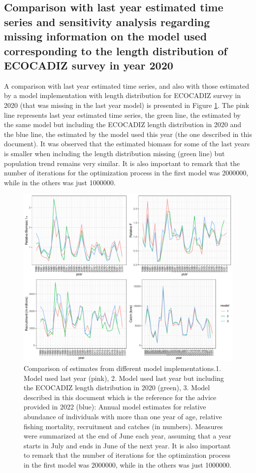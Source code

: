 \documentclass[review]{elsarticle}
\begin{document}
\subsection{Comparison with last year estimated time series and sensitivity analysis regarding missing information on the model used corresponding to the length distribution of ECOCADIZ survey in year 2020}

A comparison with last year estimated time series, and also with those estimated by a model implementation with length distribution for ECOCADIZ survey in 2020 (that was missing in the last year model) is presented in Figure \ref{modelcomp}. The pink line represents last year estimated time series, the green line, the estimated by the same model but including the ECOCADIZ length distribution in 2020 and the blue line, the estimated by the model used this year (the one described in this document).  It was observed that the estimated biomass for some of the last years is smaller when including the length distribution missing (green line) but population trend remains very similar. It is also important to remark that the number of iterations for the optimization process in the first model was 2000000, while in the others was just 1000000.

\begin{figure}[h!]
 \centering
 \includegraphics{./ICESplots_modelcomp.pdf}
 \caption{Comparison of estimates from different model implementations.1. Model used last year (pink), 2. Model used last year but including the ECOCADIZ length distribution in 2020 (green), 3. Model described in this document which is the reference for the advice provided in 2022 (blue): Annual model estimates for relative abundance of individuals with more than one year of age, relative fishing mortality, recruitment and catches (in numbers). Measures were summarized at the end of June each year, assuming that a year starts in July and ends in June of the next year. It is also important to remark that the number of iterations for the optimization process in the first model was 2000000, while in the others was just 1000000.}
 \label{modelcomp}
\end{figure}
\end{document}
